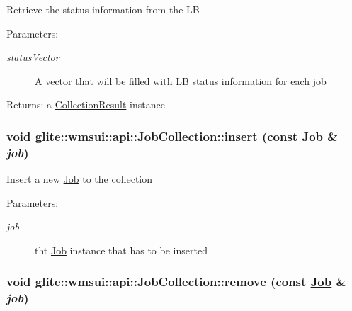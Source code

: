 Retrieve the status information from the LB \begin{Desc}
\item[Parameters:]
\begin{description}
\item[{\em status\-Vector}]A vector that will be filled with LB status information for each job \end{description}
\end{Desc}
\begin{Desc}
\item[Returns:]a \hyperlink{structglite_1_1wmsui_1_1api_1_1CollectionResult}{Collection\-Result} instance \end{Desc}
\hypertarget{classglite_1_1wmsui_1_1api_1_1JobCollection_z3_2}{
\subsubsection[insert]{\setlength{\rightskip}{0pt plus 5cm}void glite::wmsui::api::Job\-Collection::insert (const \hyperlink{classglite_1_1wmsui_1_1api_1_1Job}{Job} \& {\em job})}}
\label{classglite_1_1wmsui_1_1api_1_1JobCollection_z3_2}


Insert a new \hyperlink{classglite_1_1wmsui_1_1api_1_1Job}{Job} to the collection \begin{Desc}
\item[Parameters:]
\begin{description}
\item[{\em job}]tht \hyperlink{classglite_1_1wmsui_1_1api_1_1Job}{Job} instance that has to be inserted \end{description}
\end{Desc}
\hypertarget{classglite_1_1wmsui_1_1api_1_1JobCollection_z3_3}{
\subsubsection[remove]{\setlength{\rightskip}{0pt plus 5cm}void glite::wmsui::api::Job\-Collection::remove (const \hyperlink{classglite_1_1wmsui_1_1api_1_1Job}{Job} \& {\em job})}}
\label{classglite_1_1wmsui_1_1api_1_1JobCollection_z3_3}


